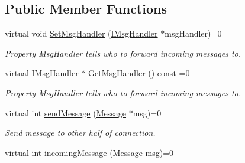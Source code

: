\subsection*{Public Member Functions}
\begin{DoxyCompactItemize}
\item 
\hypertarget{classPseudoTcp_1_1IConnection_ae3b2a63ff3d75130a9ea4e9197ff6eb2}{
virtual void \hyperlink{classPseudoTcp_1_1IConnection_ae3b2a63ff3d75130a9ea4e9197ff6eb2}{SetMsgHandler} (\hyperlink{classPseudoTcp_1_1IMsgHandler}{IMsgHandler} $\ast$msgHandler)=0}
\label{classPseudoTcp_1_1IConnection_ae3b2a63ff3d75130a9ea4e9197ff6eb2}

\begin{DoxyCompactList}\small\item\em Property MsgHandler tells who to forward incoming messages to. \item\end{DoxyCompactList}\item 
\hypertarget{classPseudoTcp_1_1IConnection_adcb33b73838a97b7abcc1b8fc4ed56a2}{
virtual \hyperlink{classPseudoTcp_1_1IMsgHandler}{IMsgHandler} $\ast$ \hyperlink{classPseudoTcp_1_1IConnection_adcb33b73838a97b7abcc1b8fc4ed56a2}{GetMsgHandler} () const =0}
\label{classPseudoTcp_1_1IConnection_adcb33b73838a97b7abcc1b8fc4ed56a2}

\begin{DoxyCompactList}\small\item\em Property MsgHandler tells who to forward incoming messages to. \item\end{DoxyCompactList}\item 
\hypertarget{classPseudoTcp_1_1IConnection_a82f7a2ca2784a9c3da5bdd022aec0f59}{
virtual int \hyperlink{classPseudoTcp_1_1IConnection_a82f7a2ca2784a9c3da5bdd022aec0f59}{sendMessage} (\hyperlink{classPseudoTcp_1_1Message}{Message} $\ast$msg)=0}
\label{classPseudoTcp_1_1IConnection_a82f7a2ca2784a9c3da5bdd022aec0f59}

\begin{DoxyCompactList}\small\item\em Send message to other half of connection. \item\end{DoxyCompactList}\item 
\hypertarget{classPseudoTcp_1_1IConnection_afe96a0f5f39c83ec5b9367734529ec68}{
virtual int \hyperlink{classPseudoTcp_1_1IConnection_afe96a0f5f39c83ec5b9367734529ec68}{incomingMessage} (\hyperlink{classPseudoTcp_1_1Message}{Message} msg)=0}
\label{classPseudoTcp_1_1IConnection_afe96a0f5f39c83ec5b9367734529ec68}


\end{DoxyCompactItemize}
